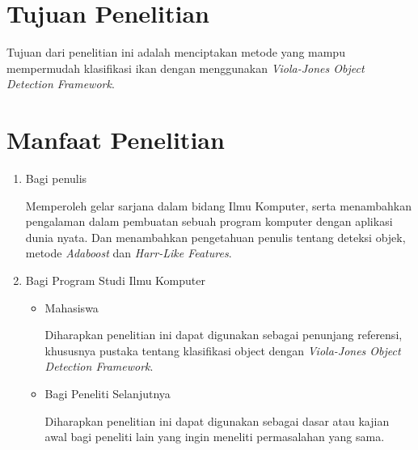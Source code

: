 \section{Tujuan Penelitian}
	Tujuan dari penelitian ini adalah menciptakan metode yang mampu mempermudah 
	klasifikasi ikan dengan menggunakan \textit{Viola-Jones Object Detection Framework}.

\section{Manfaat Penelitian}
\begin{enumerate}
	\item Bagi penulis
		
	Memperoleh gelar sarjana dalam bidang Ilmu Komputer, serta menambahkan 
	pengalaman dalam pembuatan sebuah program komputer dengan aplikasi dunia 
	nyata. Dan menambahkan pengetahuan penulis tentang deteksi objek, metode 
	\textit{Adaboost} dan \textit{Harr-Like Features}.
		
	\item Bagi Program Studi Ilmu Komputer
	
	\begin{itemize}
		\item Mahasiswa
		
		Diharapkan penelitian ini dapat digunakan sebagai penunjang referensi, 
		khususnya pustaka tentang klasifikasi object dengan 
		\textit{Viola-Jones Object Detection Framework}.

		\item Bagi Peneliti Selanjutnya
		
		Diharapkan penelitian ini dapat digunakan sebagai dasar atau kajian 
		awal bagi peneliti lain yang ingin meneliti permasalahan yang sama.

	\end{itemize}
			
\end{enumerate}

\begin{comment}

\end{comment}
